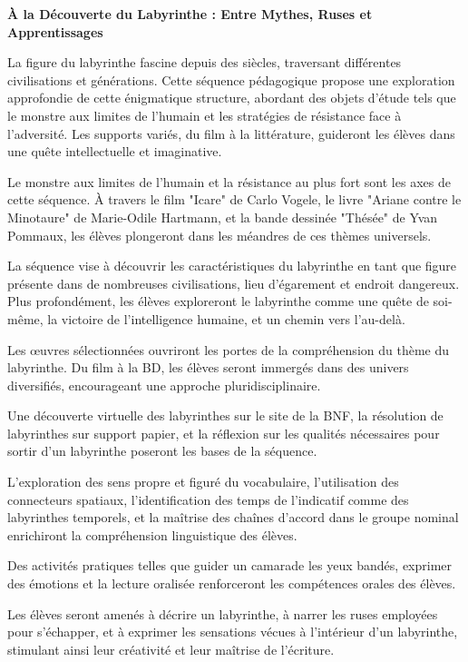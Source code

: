 
\textbf{À la Découverte du Labyrinthe : Entre Mythes, Ruses et Apprentissages}

La figure du labyrinthe fascine depuis des siècles, traversant différentes civilisations et générations. Cette séquence pédagogique propose une exploration approfondie de cette énigmatique structure, abordant des objets d'étude tels que le monstre aux limites de l'humain et les stratégies de résistance face à l'adversité. Les supports variés, du film à la littérature, guideront les élèves dans une quête intellectuelle et imaginative.

Le monstre aux limites de l'humain et la résistance au plus fort sont les axes de cette séquence. À travers le film "Icare" de Carlo Vogele, le livre "Ariane contre le Minotaure" de Marie-Odile Hartmann, et la bande dessinée "Thésée" de Yvan Pommaux, les élèves plongeront dans les méandres de ces thèmes universels.

La séquence vise à découvrir les caractéristiques du labyrinthe en tant que figure présente dans de nombreuses civilisations, lieu d'égarement et endroit dangereux. Plus profondément, les élèves exploreront le labyrinthe comme une quête de soi-même, la victoire de l'intelligence humaine, et un chemin vers l'au-delà.

Les \oe uvres sélectionnées ouvriront les portes de la compréhension du thème du labyrinthe. Du film à la BD, les élèves seront immergés dans des univers diversifiés, encourageant une approche pluridisciplinaire.

Une découverte virtuelle des labyrinthes sur le site de la BNF, la résolution de labyrinthes sur support papier, et la réflexion sur les qualités nécessaires pour sortir d'un labyrinthe poseront les bases de la séquence.

L'exploration des sens propre et figuré du vocabulaire, l'utilisation des connecteurs spatiaux, l'identification des temps de l'indicatif comme des labyrinthes temporels, et la maîtrise des chaînes d'accord dans le groupe nominal enrichiront la compréhension linguistique des élèves.

Des activités pratiques telles que guider un camarade les yeux bandés, exprimer des émotions et la lecture oralisée renforceront les compétences orales des élèves.

Les élèves seront amenés à décrire un labyrinthe, à narrer les ruses employées pour s'échapper, et à exprimer les sensations vécues à l'intérieur d'un labyrinthe, stimulant ainsi leur créativité et leur maîtrise de l'écriture.

